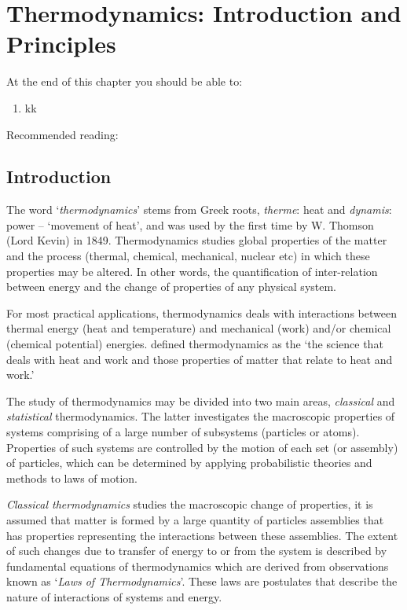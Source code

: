 
\chapter{Thermodynamics: Introduction and Principles}\label{Chapter:Introduction}
   \begin{shaded}
      \noindent
      At the end of this chapter you should be able to:
        \begin{enumerate}
           \item kk
        \end{enumerate}
\bigskip
     Recommended reading: \cite{Devoe_Chpt1_2}
   \end{shaded}

   \section{Introduction}\label{Chapter:Introduction:Section:Introduction}

   The word `{\it thermodynamics}' stems from Greek roots, {\it therme}: heat and {\it dynamis}: power -- `movement of heat', and was used by the first time by W. Thomson (Lord Kevin)\cite{Thomson_1849} in 1849. Thermodynamics studies global properties of the matter and the process (\eg thermal, chemical, mechanical, nuclear etc) in which these properties may be altered. In other words, the quantification of inter-relation between energy and the change of properties of any physical system.

   For most practical applications, thermodynamics deals with interactions between thermal energy (\ie heat and temperature) and mechanical (\ie work) and/or chemical (\ie chemical potential) energies. \cite{Borgnakke_Book} defined thermodynamics as the `the science that deals with heat and work and those properties of matter that relate to heat and work.'

   \medskip
   
   The study of thermodynamics may be divided into two main areas, {\it classical} and {\it statistical} thermodynamics. The latter investigates the macroscopic properties of systems comprising of a large number of subsystems (\ie particles or atoms). Properties of such systems are controlled by the motion of each set (or assembly) of particles, which can be determined by applying probabilistic theories and methods to laws of motion.

   {\it Classical thermodynamics} studies the macroscopic change of properties, \ie it is assumed that matter is formed by a large quantity of particles assemblies that has properties representing the interactions between these assemblies. The extent of such changes due to transfer of energy to or from the system is described by fundamental equations of thermodynamics which are derived from observations known as `{\it Laws of Thermodynamics}'. These laws are postulates that describe the nature of interactions of systems and energy.

